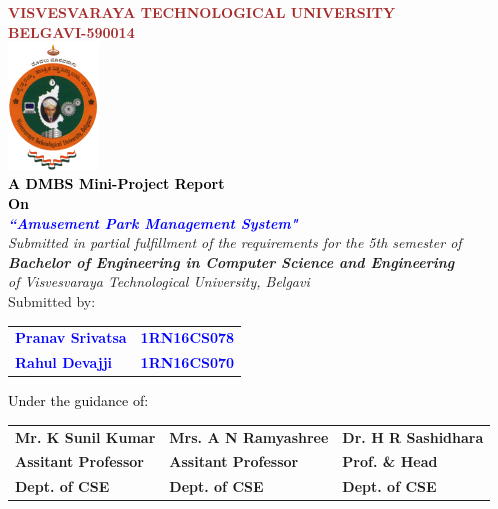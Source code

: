
\begin{titlepage}
\begin{center}
\break\break
\textup{\large {\textcolor{brown}{\bf VISVESVARAYA TECHNOLOGICAL UNIVERSITY} \\ {\textcolor{brown}{\bf BELGAVI-590014}}}}\\[0.1in]
\includegraphics[width=0.18\textwidth]{./VTU.png}\\[0.1in]
\textup{\small {\textcolor{black}{\textbf {A DMBS Mini-Project Report} \\ {\textbf {On}}}}} \\[0.2in]
\textup{\large {\textcolor{blue}{\textbf {\textit {``Amusement Park Management System"}}}}} \\[0.2in]
\textup{{\textit {Submitted in partial fulfillment of the requirements for the 5th semester of} \\ {\textbf {\textit {Bachelor of Engineering in Computer Science and Engineering}} \\ \textit {of Visvesvaraya Technological University, Belgavi}}}}\\[0.15in]
\textup{Submitted by:}
\break\break
\begin{tabular}{l  l}
\textcolor{blue}{\textbf{Pranav Srivatsa}} & \textcolor{blue}{\hspace{2.7cm}\textbf{1RN16CS078}}\\[0.3in]
\textcolor{blue}{\textbf{Rahul Devajji}} & \textcolor{blue}{\hspace{2.7cm}\textbf{1RN16CS070}}\\
\end{tabular}
\break\break\break\break
\textup{\normalsize {\textcolor{black}{ Under the guidance of:}}}\break\break
\begin{tabular}{l l l}
\textbf{Mr. K Sunil Kumar} & \hspace{0.7cm}\textbf{Mrs. A N Ramyashree} & \hspace{0.7cm}\textbf{Dr. H R Sashidhara}\\
\textbf{Assitant Professor} & \hspace{0.7cm}\textbf{Assitant Professor}  & \hspace{0.7cm}\textbf{Prof. \& Head}\\
\textbf{Dept. of CSE} & \hspace{0.7cm}\textbf{Dept. of CSE}  & \hspace{0.7cm}\textbf{Dept. of CSE}\\[0.2in]
\end{tabular}


\end{center}
\end{titlepage}

